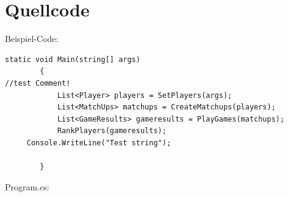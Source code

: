 \documentclass[a4paper,11pt,ngerman]{scrartcl}
\begin{document}
\section{Quellcode}
Beispiel-Code:
\begin{lstlisting}
static void Main(string[] args)
        {
//test Comment!
            List<Player> players = SetPlayers(args);
            List<MatchUps> matchups = CreateMatchups(players);
            List<GameResults> gameresults = PlayGames(matchups);
            RankPlayers(gameresults);
	 Console.WriteLine("Test string");
            
        }
\end{lstlisting}
Program.cs:

\end{document}

